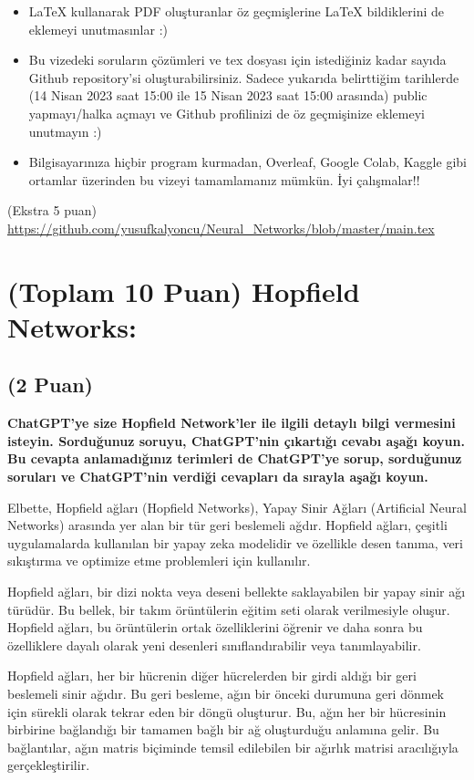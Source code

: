 \documentclass[11pt]{article}
\begin{document}
\begin{itemize}
    \item LaTeX kullanarak PDF oluşturanlar öz geçmişlerine LaTeX bildiklerini de eklemeyi unutmasınlar :)
    \item Bu vizedeki soruların çözümleri ve tex dosyası için istediğiniz kadar sayıda Github repository'si oluşturabilirsiniz. Sadece yukarıda belirttiğim tarihlerde (14 Nisan 2023 saat 15:00 ile 15 Nisan 2023 saat 15:00 arasında) public yapmayı/halka açmayı ve Github profilinizi de öz geçmişinize eklemeyi unutmayın :)
    \item Bilgisayarınıza hiçbir program kurmadan, Overleaf, Google Colab, Kaggle gibi ortamlar üzerinden bu vizeyi tamamlamanız mümkün. İyi çalışmalar!!
\end{itemize}

(Ekstra 5 puan) \url{https://github.com/yusufkalyoncu/Neural_Networks/blob/master/main.tex}

\newpage
\section{(Toplam 10 Puan) Hopfield Networks:}

\subsection{(2 Puan)} \textbf{ChatGPT’ye size Hopfield Network’ler ile ilgili detaylı bilgi vermesini isteyin. Sorduğunuz soruyu, ChatGPT'nin çıkartığı cevabı aşağı koyun. Bu cevapta anlamadığınız terimleri de ChatGPT’ye sorup, sorduğunuz soruları ve ChatGPT’nin verdiği cevapları da sırayla aşağı koyun.}

Elbette, Hopfield ağları (Hopfield Networks), Yapay Sinir Ağları (Artificial Neural Networks) arasında yer alan bir tür geri beslemeli ağdır. Hopfield ağları, çeşitli uygulamalarda kullanılan bir yapay zeka modelidir ve özellikle desen tanıma, veri sıkıştırma ve optimize etme problemleri için kullanılır.

Hopfield ağları, bir dizi nokta veya deseni bellekte saklayabilen bir yapay sinir ağı türüdür. Bu bellek, bir takım örüntülerin eğitim seti olarak verilmesiyle oluşur. Hopfield ağları, bu örüntülerin ortak özelliklerini öğrenir ve daha sonra bu özelliklere dayalı olarak yeni desenleri sınıflandırabilir veya tanımlayabilir.

Hopfield ağları, her bir hücrenin diğer hücrelerden bir girdi aldığı bir geri beslemeli sinir ağıdır. Bu geri besleme, ağın bir önceki durumuna geri dönmek için sürekli olarak tekrar eden bir döngü oluşturur. Bu, ağın her bir hücresinin birbirine bağlandığı bir tamamen bağlı bir ağ oluşturduğu anlamına gelir. Bu bağlantılar, ağın matris biçiminde temsil edilebilen bir ağırlık matrisi aracılığıyla gerçekleştirilir.
\end{document}
